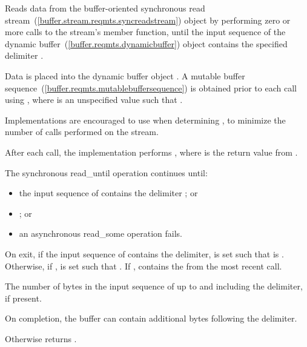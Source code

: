 \begin{itemdescr}
\pnum
\effects Reads data from the buffer-oriented synchronous read stream~(\ref{buffer.stream.reqmts.syncreadstream}) object  by performing zero or more calls to the stream's  member function, until the input sequence of the dynamic buffer~(\ref{buffer.reqmts.dynamicbuffer}) object  contains the specified delimiter .

\pnum
Data is placed into the dynamic buffer object . A mutable buffer sequence~(\ref{buffer.reqmts.mutablebuffersequence}) is obtained prior to each  call using , where  is an unspecified value such that . \begin{note} Implementations are encouraged to use  when determining , to minimize the number of  calls performed on the stream. \end{note} After each  call, the implementation performs , where  is the return value from .

\pnum
The synchronous read_until operation continues until:

\begin{itemize}
\item
the input sequence of  contains the delimiter ; or
\item
{}; or
\item
an asynchronous read_some operation fails.
\end{itemize}

\pnum
On exit, if the input sequence of  contains the delimiter,  is set such that  is . Otherwise, if ,  is set such that . If ,  contains the  from the most recent  call.

\pnum
\returns The number of bytes in the input sequence of  up to and including the delimiter, if present. \begin{note} On completion, the buffer can contain additional bytes following the delimiter. \end{note} Otherwise returns .
\end{itemdescr}



